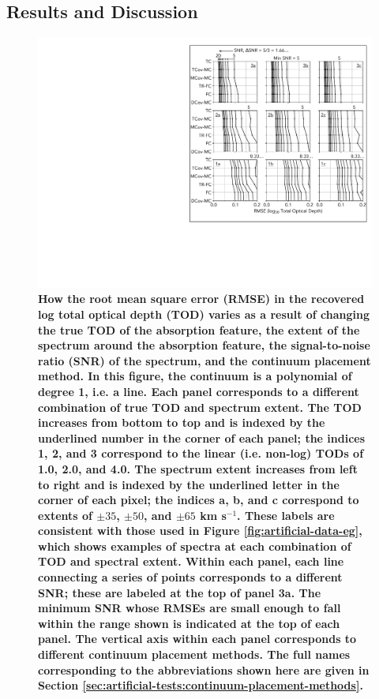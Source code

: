 \documentclass[trackchanges]{aastex62}
\begin{document}
{ \bf
\subsection{Results and Discussion}

\begin{figure}
  \includegraphics[width=\linewidth]{figures/annotated_co1_RMSEs_vs_SNR.pdf}
  \caption{
  \bf
  How the root mean square error (RMSE) in the recovered log total optical depth (TOD) varies as a result of changing the true TOD of the absorption feature, the extent of the spectrum around the absorption feature, the signal-to-noise ratio (SNR) of the spectrum, and the continuum placement method.
  In this figure, the continuum is a polynomial of degree 1, i.e. a line.
  Each panel corresponds to a different combination of true TOD and spectrum extent.
  The TOD increases from bottom to top and is indexed by the underlined number in the corner of each panel; the indices 1, 2, and 3 correspond to the linear (i.e. non-log) TODs of 1.0, 2.0, and 4.0. The spectrum extent increases from left to right and is indexed by the underlined letter in the corner of each pixel; the indices a, b, and c correspond to extents of $\pm 35$, $\pm 50$, and $\pm 65$ km s$^{-1}$. These labels are consistent with those used in Figure \ref{fig:artificial-data-eg}, which shows examples of spectra at each combination of TOD and spectral extent.
  Within each panel, each line connecting a series of points corresponds to a different SNR; these are labeled at the top of panel 3a. The minimum SNR whose RMSEs are small enough to fall within the range shown is indicated at the top of each panel.
  The vertical axis within each panel corresponds to different continuum placement methods. The full names corresponding to the abbreviations shown here are given in Section \ref{sec:artificial-tests:continuum-placement-methods}.
  }
  \label{fig:outcomes-CO-1}
\end{figure}

}
\end{document}
